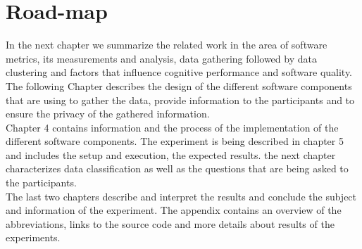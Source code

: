 \section{Road-map}
In the next chapter we summarize the related work in the area of software metrics, its measurements and analysis, data gathering followed by data clustering and factors that influence cognitive performance and software quality.\\
The following Chapter describes the design of the different software components that are using to gather the data, provide information to the participants and to ensure the privacy of the gathered information.\\
Chapter 4 contains information and the process of the implementation of the different software components. 
The experiment is being described in chapter 5 and includes the setup and execution, the expected results. the next chapter characterizes data classification as well as the questions that are being asked to the participants. \\
The last two chapters describe and interpret the results and conclude the subject and information of the experiment.
The appendix contains an overview of the abbreviations, links to the source code and more details about results of the experiments.

